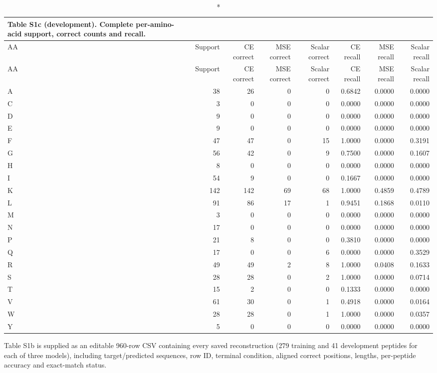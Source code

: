 \begin{longtable}{lrrrrrrr}
\caption*{\textbf{Table S1c (development).} Complete per-amino-acid support, correct counts and recall.}\\
\toprule
AA & Support & CE correct & MSE correct & Scalar correct & CE recall & MSE recall & Scalar recall \\
\midrule\endfirsthead
AA & Support & CE correct & MSE correct & Scalar correct & CE recall & MSE recall & Scalar recall \\
\midrule\endhead
A & 38 & 26 & 0 & 0 & 0.6842 & 0.0000 & 0.0000 \\
C & 3 & 0 & 0 & 0 & 0.0000 & 0.0000 & 0.0000 \\
D & 9 & 0 & 0 & 0 & 0.0000 & 0.0000 & 0.0000 \\
E & 9 & 0 & 0 & 0 & 0.0000 & 0.0000 & 0.0000 \\
F & 47 & 47 & 0 & 15 & 1.0000 & 0.0000 & 0.3191 \\
G & 56 & 42 & 0 & 9 & 0.7500 & 0.0000 & 0.1607 \\
H & 8 & 0 & 0 & 0 & 0.0000 & 0.0000 & 0.0000 \\
I & 54 & 9 & 0 & 0 & 0.1667 & 0.0000 & 0.0000 \\
K & 142 & 142 & 69 & 68 & 1.0000 & 0.4859 & 0.4789 \\
L & 91 & 86 & 17 & 1 & 0.9451 & 0.1868 & 0.0110 \\
M & 3 & 0 & 0 & 0 & 0.0000 & 0.0000 & 0.0000 \\
N & 17 & 0 & 0 & 0 & 0.0000 & 0.0000 & 0.0000 \\
P & 21 & 8 & 0 & 0 & 0.3810 & 0.0000 & 0.0000 \\
Q & 17 & 0 & 0 & 6 & 0.0000 & 0.0000 & 0.3529 \\
R & 49 & 49 & 2 & 8 & 1.0000 & 0.0408 & 0.1633 \\
S & 28 & 28 & 0 & 2 & 1.0000 & 0.0000 & 0.0714 \\
T & 15 & 2 & 0 & 0 & 0.1333 & 0.0000 & 0.0000 \\
V & 61 & 30 & 0 & 1 & 0.4918 & 0.0000 & 0.0164 \\
W & 28 & 28 & 0 & 1 & 1.0000 & 0.0000 & 0.0357 \\
Y & 5 & 0 & 0 & 0 & 0.0000 & 0.0000 & 0.0000 \\
\bottomrule\end{longtable}\endgroup
\noindent Table S1b is supplied as an editable 960-row CSV containing every saved reconstruction (279 training and 41 development peptides for each of three models), including target/predicted sequences, row ID, terminal condition, aligned correct positions, lengths, per-peptide accuracy and exact-match status.
